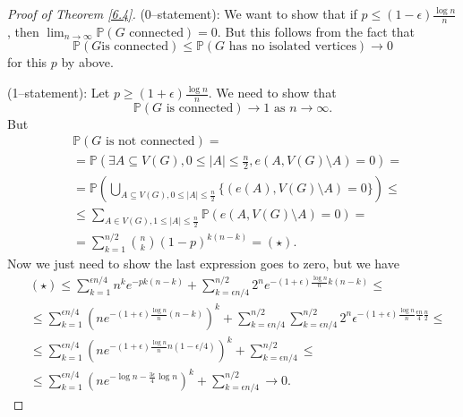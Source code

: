 \documentclass{article}
\theoremstyle{definition}
\begin{document}
\begin{proof}[Proof of Theorem \ref{6.4}]
    (0--statement): We want to show that if $p\le (1-\epsilon)\frac{\log n}{n}$, then $\lim_{n \to \infty} \mathbb{P}(G \text{ connected}) = 0$. But this follows from the fact that $$\mathbb{P}(G \text{is connected})\le \mathbb{P}(G \text{ has no isolated vertices}) \to 0$$
    for this $p$ by above.
    \vspace{1mm}
    
    (1--statement): Let $p\ge (1+\epsilon)\frac{\log n}{n}$. We need to show that 
    \[
    \mathbb{P}(G \text{ is connected}) \to 1 \text{ as }n \to \infty.
    \]
    But 
    \begin{align*}
        &\mathbb{P}(G \text{ is not connected}) = \\
        &=\mathbb{P}(\exists A \subseteq V(G), 0\le |A|\le \frac{n}{2}, e(A,V(G)\setminus A)=0) = \\
        & =\mathbb{P}\left( \bigcup_{A \subseteq V(G), 0\le |A|\le \frac{n}{2}} \{(e(A),V(G)\setminus A)=0\}\right) \le \\
        &\le \sum_{A \in V(G), 1\le |A|\le \frac{n}{2}}^{} \mathbb{P}(e(A,V(G)\setminus A)=0) = \\
        &= \sum_{k=1}^{n/2} {n\choose{k}}(1-p)^{k(n-k)} = (\star).
    \end{align*}
    Now we just need to show the last expression goes to zero, but we have
    \begin{align*}
        &(\star) \le \sum_{k=1}^{\epsilon n/4} n^k e^{-pk(n-k)} + \sum_{k=\epsilon n/4}^{n/2} 2^n e^{-(1+\epsilon)\frac{\log n}{n}k(n-k)} \le \\
        &\le \sum_{k=1}^{\epsilon n/4} \left(n e^{-(1+\epsilon)\frac{\log n}{n}(n-k)}\right)^k + \sum_{k=\epsilon n/4}^{n/2} \sum_{k=\epsilon n/4}^{n/2} 2^n \epsilon^{-(1+\epsilon)\frac{\log n}{n} \frac{\epsilon n}{4} \frac{n}{2}} \le \\
        &\le \sum_{k=1}^{\epsilon n/4} \left(ne^{-(1+\epsilon)\frac{\log n}{n}n(1-\epsilon/4)}\right)^k + \sum_{k=\epsilon n/4}^{n/2} \le \\
        &\le \sum_{k=1}^{\epsilon n/4} \left( n e^{-\log n - \frac{3 \epsilon}{4}\log n} \right)^k + \sum_{k=\epsilon n/4}^{n/2} \to 0.
    \end{align*} 
\end{proof}
\end{document}
